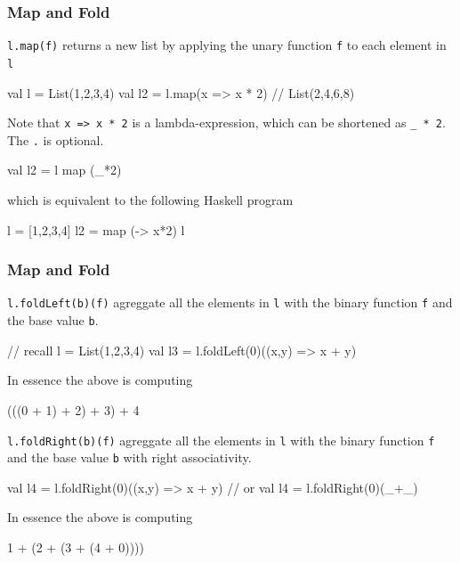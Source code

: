 \documentclass{beamer}
\newcommand{\beb}{\begin{exampleblock}}
\newcommand{\eeb}{\end{exampleblock}}
\begin{document}
\begin{frame}[fragile]
\frametitle{Map and Fold}
{\tt l.map(f)} returns a new list by applying the unary function {\tt f} to each
element in {\tt l}
\beb{}
\begin{code}
val l = List(1,2,3,4)
val l2 = l.map(x => x * 2) // List(2,4,6,8)
\end{code}
\eeb
%
Note that {\tt x => x * 2} is a lambda-expression, which can be
shortened as {\tt \_ * 2}. The {\tt .} is optional.
\beb{}
\begin{code}
val l2 = l map (_*2) 
\end{code}
\eeb
which is equivalent to the following Haskell program
\beb{}
\begin{code}
l = [1,2,3,4]
l2 = map (\x -> x*2) l
\end{code}
\eeb
\end{frame}

\begin{frame}[fragile]
\frametitle{Map and Fold}

{\tt l.foldLeft(b)(f)} agreggate all the
elements in {\tt l} with the binary function {\tt f} and the base value
{\tt b}.
\beb{}
\begin{code}
// recall l = List(1,2,3,4)
val l3 = l.foldLeft(0)((x,y) => x + y)
\end{code}
\eeb
In essence the above is computing 
\begin{code}
(((0 + 1) + 2) + 3) + 4
\end{code}
{\tt l.foldRight(b)(f)} agreggate all the
elements in {\tt l} with the binary function {\tt f} and the base value
{\tt b} with right associativity.
\beb{}
\begin{code}
val l4 = l.foldRight(0)((x,y) => x + y) 
// or val l4 =  l.foldRight(0)(_+_) 
\end{code}
\eeb
In essence the above is computing 
\begin{code}
1 + (2 + (3 + (4 + 0))))
\end{code}

\end{frame}
\end{document}
